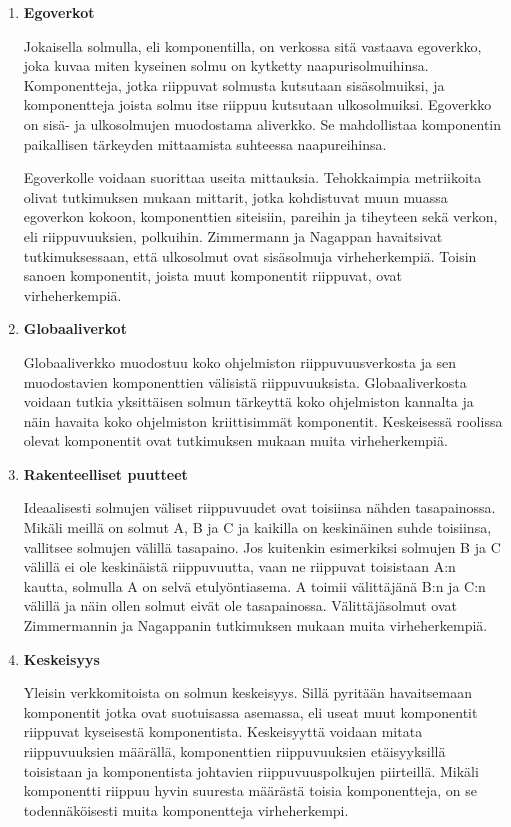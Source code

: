 \documentclass[finnish]{../tktltiki2}
\theoremstyle{definition}
\theoremstyle{remark}
\begin{document}
\begin{enumerate}
    
    \item {\bf Egoverkot}
    
    Jokaisella solmulla, eli komponentilla, on verkossa sitä vastaava egoverkko, joka kuvaa miten kyseinen solmu on 
    kytketty naapurisolmuihinsa. Komponentteja, jotka riippuvat solmusta kutsutaan sisäsolmuiksi, ja komponentteja 
    joista solmu itse riippuu kutsutaan ulkosolmuiksi. Egoverkko on sisä- ja ulkosolmujen muodostama aliverkko. Se 
    mahdollistaa komponentin paikallisen tärkeyden mittaamista suhteessa naapureihinsa.
    
    Egoverkolle voidaan suorittaa useita mittauksia. Tehokkaimpia metriikoita olivat tutkimuksen mukaan mittarit, jotka 
    kohdistuvat muun muassa egoverkon kokoon, komponenttien siteisiin, pareihin ja tiheyteen sekä verkon, eli 
    riippuvuuksien, polkuihin. Zimmermann ja Nagappan havaitsivat tutkimuksessaan, että ulkosolmut ovat sisäsolmuja 
    virheherkempiä. Toisin sanoen komponentit, joista muut komponentit riippuvat, ovat virheherkempiä.
    
    \item {\bf Globaaliverkot}
    
    Globaaliverkko muodostuu koko ohjelmiston riippuvuusverkosta ja sen muodostavien komponenttien välisistä 
    riippuvuuksista. Globaaliverkosta voidaan tutkia yksittäisen solmun tärkeyttä koko ohjelmiston kannalta ja näin 
    havaita koko ohjelmiston kriittisimmät komponentit. Keskeisessä roolissa olevat komponentit ovat tutkimuksen mukaan 
    muita virheherkempiä.
    
    \item {\bf Rakenteelliset puutteet}
    
    Ideaalisesti solmujen väliset riippuvuudet ovat toisiinsa nähden tasapainossa. Mikäli meillä on solmut A, B ja C ja 
    kaikilla on keskinäinen suhde toisiinsa, vallitsee solmujen välillä tasapaino. Jos kuitenkin esimerkiksi solmujen B 
    ja C välillä ei ole keskinäistä riippuvuutta, vaan ne riippuvat toisistaan A:n kautta, solmulla A on selvä 
    etulyöntiasema. A toimii välittäjänä B:n ja C:n välillä ja näin ollen solmut eivät ole tasapainossa. Välittäjäsolmut 
    ovat Zimmermannin ja Nagappanin tutkimuksen mukaan muita virheherkempiä.
    
    \item {\bf Keskeisyys}
    
    Yleisin verkkomitoista on solmun keskeisyys. Sillä pyritään havaitsemaan komponentit jotka ovat suotuisassa 
    asemassa, eli useat muut komponentit riippuvat kyseisestä komponentista. Keskeisyyttä voidaan mitata riippuvuuksien 
    määrällä, komponenttien riippuvuuksien etäisyyksillä toisistaan ja komponentista johtavien riippuvuuspolkujen 
    piirteillä. Mikäli komponentti riippuu hyvin suuresta määrästä toisia komponentteja, on se todennäköisesti muita 
    komponentteja virheherkempi.
    

\end{enumerate}
\end{document}
